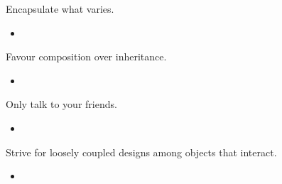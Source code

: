 \documentclass{beamer}
\begin{document}
\begin{frame}{Encapsulate what varies.}
    \begin{itemize}
        \item
    \end{itemize}
\end{frame}

\begin{frame}{Favour composition over inheritance.}
    \begin{itemize}
        \item
    \end{itemize}
\end{frame}

\begin{frame}{Only talk to your friends.}
    \begin{itemize}
        \item
    \end{itemize}
\end{frame}

\begin{frame}{Strive for loosely coupled designs among objects that interact.}
    \begin{itemize}
        \item
    \end{itemize}
\end{frame}
\end{document}
